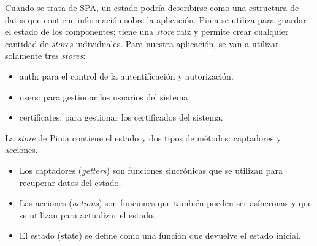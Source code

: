 Cuando se trata de SPA, un estado podría describirse como una estructura de datos que contiene información sobre la aplicación. Pinia se utiliza para guardar el estado de los componentes; tiene una \textit{store} raíz y permite crear cualquier cantidad de \textit{stores} individuales. Para nuestra aplicación, se van a utilizar solamente tres \textit{stores}:

\begin{itemize}
\item auth: para el control de la autentificación y autorización.
\item users: para gestionar los usuarios del sistema.
\item certificates: para gestionar los certificados del sistema.
\end{itemize}

La \textit{store} de Pinia contiene el estado y dos tipos de métodos: captadores y acciones.
\begin{itemize}
\item Los captadores (\textit{getters}) son funciones sincrónicas que se utilizan para recuperar datos del estado.
\item Las acciones (\textit{actions}) son funciones que también pueden ser asíncronas y que se utilizan para actualizar el estado.
\item El estado (state) se define como una función que devuelve el estado inicial.
\end{itemize}


